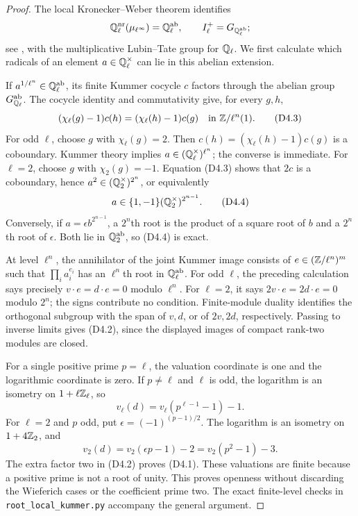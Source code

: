 \begin{proof}
The local Kronecker--Weber theorem identifies
\[
 \mathbb Q_\ell^{\mathrm{nr}}(\mu_{\ell^\infty})
   =\mathbb Q_\ell^{\mathrm{ab}},
 \qquad I_\ell^+=G_{\mathbb Q_\ell^{\mathrm{ab}}};
\]
see \citet[I, Theorem 4.8 and Corollary 4.12]{BMilneCFT2020},
with the multiplicative Lubin--Tate group for $\mathbb Q_\ell$.
We first calculate which radicals of an element $a\in\mathbb Q_\ell^\times$
can lie in this abelian extension.

If $a^{1/\ell^n}\in\mathbb Q_\ell^{\mathrm{ab}}$, its finite Kummer cocycle
$c$ factors through the abelian group $G_{\mathbb Q_\ell}^{\mathrm{ab}}$.
The cocycle identity and commutativity give, for every $g,h$,
\[
 (\chi_\ell(g)-1)c(h)=(\chi_\ell(h)-1)c(g)
 \quad\text{in }\mathbb Z/\ell^n(1).
\tag{D4.3}
\]
For odd $\ell$, choose $g$ with $\chi_\ell(g)=2$.
Then $c(h)=(\chi_\ell(h)-1)c(g)$ is a coboundary. Kummer theory
implies $a\in(\mathbb Q_\ell^\times)^{\ell^n}$; the converse is immediate.
For $\ell=2$, choose $g$ with $\chi_2(g)=-1$. Equation (D4.3)
shows that $2c$ is a coboundary, hence
$a^2\in(\mathbb Q_2^\times)^{2^n}$, or equivalently
\[
 a\in\{1,-1\}(\mathbb Q_2^\times)^{2^{n-1}}.
\tag{D4.4}
\]
Conversely, if $a=\epsilon b^{2^{n-1}}$, a $2^n$th root is the
product of a square root of $b$ and a $2^n$th root of $\epsilon$.
Both lie in $\mathbb Q_2^{\mathrm{ab}}$, so (D4.4) is exact.

At level $\ell^n$, the annihilator of the joint Kummer image consists
of $e\in(\mathbb Z/\ell^n)^m$ such that
$\prod_i a_i^{e_i}$ has an $\ell^n$th root in
$\mathbb Q_\ell^{\mathrm{ab}}$. For odd $\ell$, the preceding calculation
says precisely $v\cdot e=d\cdot e=0$ modulo $\ell^n$.
For $\ell=2$, it says $2v\cdot e=2d\cdot e=0$ modulo $2^n$;
the signs contribute no condition. Finite-module duality identifies
the orthogonal subgroup with the span of $v,d$, or of $2v,2d$,
respectively. Passing to inverse limits gives (D4.2), since the
displayed images of compact rank-two modules are closed.

For a single positive prime $p=\ell$, the valuation coordinate is
one and the logarithmic coordinate is zero. If $p\ne\ell$ and
$\ell$ is odd, the logarithm is an isometry on $1+\ell\mathbb Z_\ell$, so
\[
 v_\ell(d)=v_\ell(p^{\ell-1}-1)-1.
\]
For $\ell=2$ and $p$ odd, put $\epsilon=(-1)^{(p-1)/2}$.
The logarithm is an isometry on $1+4\mathbb Z_2$, and
\[
 v_2(d)=v_2(\epsilon p-1)-2=v_2(p^2-1)-3.
\]
The extra factor two in (D4.2) proves (D4.1). These valuations are
finite because a positive prime is not a root of unity. This proves
openness without discarding the Wieferich cases or the coefficient
prime two. The exact finite-level checks in
\texttt{root\_local\_kummer.py} accompany the general argument.
\end{proof}
